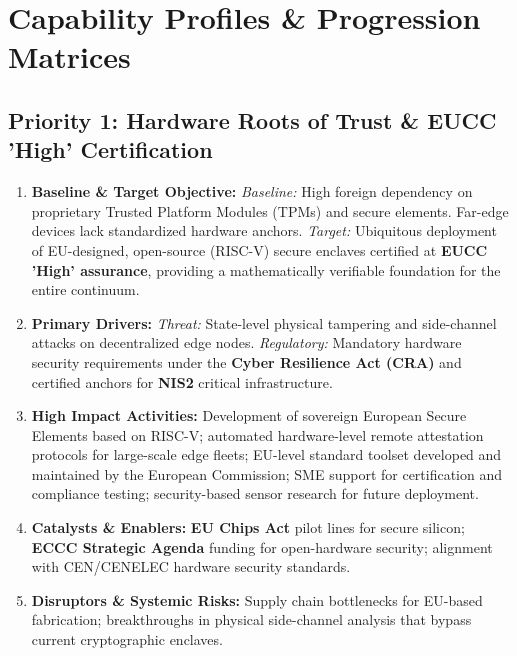 \documentclass{ieeeaccess}
\begin{document}
\section{Capability Profiles \& Progression Matrices}

\subsection*{Priority 1: Hardware Roots of Trust \& EUCC 'High' Certification}

\begin{enumerate}
\item \textbf{Baseline \& Target Objective:}
\textit{Baseline:} High foreign dependency on proprietary Trusted Platform Modules (TPMs) and secure elements. Far-edge devices lack standardized hardware anchors.
\textit{Target:} Ubiquitous deployment of EU-designed, open-source (RISC-V) secure enclaves certified at \textbf{EUCC 'High' assurance}, providing a mathematically verifiable foundation for the entire continuum.

\item \textbf{Primary Drivers:} 
\textit{Threat:} State-level physical tampering and side-channel attacks on decentralized edge nodes. 
\textit{Regulatory:} Mandatory hardware security requirements under the \textbf{Cyber Resilience Act (CRA)} and certified anchors for \textbf{NIS2} critical infrastructure.

\item \textbf{High Impact Activities:} 
Development of sovereign European Secure Elements based on RISC-V; automated hardware-level remote attestation protocols for large-scale edge fleets; EU-level standard toolset developed and maintained by the European Commission; SME support for certification and compliance testing; security-based sensor research for future deployment.

\item \textbf{Catalysts \& Enablers:} 
\textbf{EU Chips Act} pilot lines for secure silicon; \textbf{ECCC Strategic Agenda} funding for open-hardware security; alignment with CEN/CENELEC hardware security standards.

\item \textbf{Disruptors \& Systemic Risks:} 
Supply chain bottlenecks for EU-based fabrication; breakthroughs in physical side-channel analysis that bypass current cryptographic enclaves.


\end{enumerate}
\end{document}
